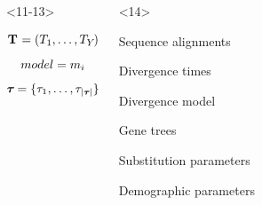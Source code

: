 \begin{frame}
\begin{columns}[c]
        \begin{onlyenv}<11-13>
            \begin{minipage}[c][0.5\textheight][c]{\linewidth}
                \begin{displaybox}[0.95\linewidth]
                    \begin{minipage}[c][0.45\textheight][c]{0.95\linewidth}
                        \[
                            \mathbf{T_{}} = (T_{1},\ldots,T_{Y_{}})
                        \]\vspace{0mm}
                        \[
                            model = m_{i}
                        \]\vspace{0mm}
                        \[
                            \boldsymbol{\tau_{}} = \{\tau_{1},\ldots,\tau_{\lvert \boldsymbol{\tau_{}} \rvert}\}
                        \]\vspace{0mm}
                    \end{minipage}
                \end{displaybox}
            \end{minipage}
        \end{onlyenv}
        \begin{onlyenv}<14>
            \begin{minipage}[c][0.5\textheight][c]{\linewidth}
                \begin{mydescription}
                    \item[\alignmentVector] Sequence alignments
                    \item[\divTimeMapVector] Divergence times
                    \item[\divModel{}] Divergence model
                    \item[\geneTreeVector] Gene trees
                    \item[\hkyModelVector] Substitution parameters
                    \item[\demographicParamVector] Demographic parameters

\end{mydescription}
\end{minipage}
\end{onlyenv}
\end{columns}
\end{frame}
